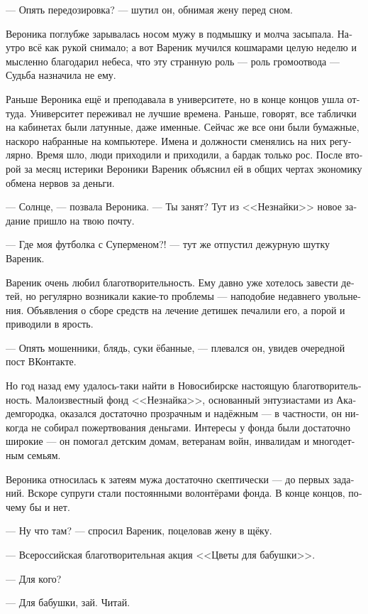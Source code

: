 \documentclass[a5paper,12pt,fleqn]{extbook}\usepackage{cooltooltips}\usepackage{polyglossia}\setdefaultlanguage[babelshorthands=true]{russian}\setotherlanguage{english}\defaultfontfeatures{Ligatures=TeX,Mapping=tex-text} \usepackage{xcolor}\definecolor{lightgray}{HTML}{bbbbbb}\color{lightgray}\newcommand{\ml}[3]{\textenglish{\textcolor{black}{#3}}}
\newcommand{\asterism}{\vspace{1em}{\centering\Large\bfseries$\ast~\ast~\ast$\par}\vspace{1em}}
\begin{document}
--- Опять передозировка? --- шутил он, обнимая жену перед сном.

Вероника поглубже зарывалась носом мужу в подмышку и молча засыпала.
Наутро всё как рукой снимало;
а вот Вареник мучился кошмарами целую неделю и мысленно благодарил небеса, что эту странную роль --- роль громоотвода --- Судьба назначила не ему.

Раньше Вероника ещё и преподавала в университете, но в конце концов ушла оттуда.
Университет переживал не лучшие времена.
Раньше, говорят, все таблички на кабинетах были латунные, даже именные.
Сейчас же все они были бумажные, наскоро набранные на компьютере.
Имена и должности сменялись на них регулярно.
Время шло, люди приходили и приходили, а бардак только рос.
После второй за месяц истерики Вероники Вареник объяснил ей в общих чертах экономику обмена нервов за деньги.

\asterism

--- Солнце, --- позвала Вероника.
--- Ты занят?
Тут из <<Незнайки>> новое задание пришло на твою почту.

--- Где моя футболка с Суперменом?! --- тут же отпустил дежурную шутку Вареник.

Вареник очень любил благотворительность.
Ему давно уже хотелось завести детей, но регулярно возникали какие-то проблемы --- наподобие недавнего увольнения.
Объявления о сборе средств на лечение детишек печалили его, а порой и приводили в ярость.

--- Опять мошенники, блядь, суки ёбанные, --- плевался он, увидев очередной пост ВКонтакте.

Но год назад ему удалось-таки найти в Новосибирске настоящую благотворительность.
Малоизвестный фонд <<Незнайка>>, основанный энтузиастами из Академгородка, оказался достаточно прозрачным и надёжным --- в частности, он никогда не собирал пожертвования деньгами.
Интересы у фонда были достаточно широкие --- он помогал детским домам, ветеранам войн, инвалидам и многодетным семьям.

Вероника относилась к затеям мужа достаточно скептически --- до первых заданий.
Вскоре супруги стали постоянными волонтёрами фонда.
В конце концов, почему бы и нет.

--- Ну что там? --- спросил Вареник, поцеловав жену в щёку.

--- Всероссийская благотворительная акция <<Цветы для бабушки>>.

--- Для кого?

--- Для бабушки, зай.
Читай.
\end{document}
